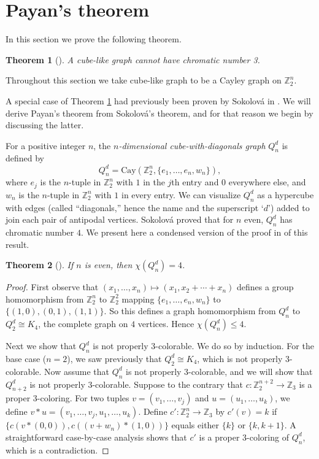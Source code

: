 \documentclass{article}
\newtheorem{Thm}{Theorem}[section]
\theoremstyle{definition}
\theoremstyle{remark}
\begin{document}
\section{Payan's theorem}\label{section-payans-theorem}

In this section we prove the following theorem.

\begin{Thm}[\cite{Payan}]\label{theorem-Payan}A cube-like graph cannot have chromatic number 3.\end{Thm}

Throughout this section we take cube-like graph to be a Cayley graph on $\mathbb{Z}_2^n$.

A special case of Theorem \ref{theorem-Payan} had previously been proven by Sokolov\'{a} in \cite{Sokolova}.  We will derive Payan's theorem from Sokolov\'{a}'s theorem, and for that reason we begin by discussing the latter.

For a positive integer $n$, the \emph{$n$-dimensional cube-with-diagonals graph} $Q^d_n$ is defined by \[Q_n^d=\text{Cay}(\mathbb{Z}_2^n,\{e_1,\dots,e_n,w_n\}),\] where $e_j$ is the $n$-tuple in $\mathbb{Z}_2^n$ with $1$ in the $j$th entry and $0$ everywhere else, and $w_n$ is the $n$-tuple in $\mathbb{Z}_2^n$ with $1$ in every entry.  We can visualize $Q^d_n$ as a hypercube with edges (called ``diagonals,'' hence the name and the superscript `$d$') added to join each pair of antipodal vertices.  Sokolov\'{a} proved that for $n$ even, $Q^d_n$ has chromatic number $4$.  We present here a condensed version of the proof in \cite{Sokolova} of this result.

\begin{Thm}[\cite{Sokolova}]\label{theorem-Sokolova}If $n$ is even, then $\chi(Q_n^d)=4$.\end{Thm}

\begin{proof}First observe that $(x_1,\dots,x_n)\mapsto (x_1,x_2+\cdots+x_n)$ defines a group homomorphism from $\mathbb{Z}^n_2$ to $\mathbb{Z}^2_2$ mapping $\{e_1,\dots,e_n,w_n\}$ to $\{(1,0),(0,1),(1,1)\}$.  So this defines a graph homomorphism from $Q^d_n$ to $Q_2^d\cong K_4$, the complete graph on $4$ vertices.  Hence $\chi(Q_n^d)\leq 4$.

Next we show that $Q^d_n$ is not properly $3$-colorable.  We do so by induction.  For the base case ($n=2$), we saw previously that $Q^d_2\cong K_4$, which is not properly $3$-colorable.  Now assume that $Q^d_n$ is not properly $3$-colorable, and we will show that $Q^d_{n+2}$ is not properly $3$-colorable.  Suppose to the contrary that $c\colon \mathbb{Z}^{n+2}_2\to\mathbb{Z}_3$ is a proper $3$-coloring.  For two tuples $v=(v_1,\dots,v_j)$ and $u=(u_1,\dots,u_k)$, we define $v*u=(v_1,\dots,v_j,u_1,\dots,u_k)$.  Define $c'\colon\mathbb{Z}^{n}_2\to\mathbb{Z}_3$ by $c'(v)=k$ if $\{c(v*(0,0)),c((v+w_n)*(1,0))\}$ equals either $\{k\}$ or $\{k,k+1\}$.  A straightforward case-by-case analysis shows that $c'$ is a proper $3$-coloring of $Q^d_n$, which is a contradiction.\end{proof}
\end{document}
